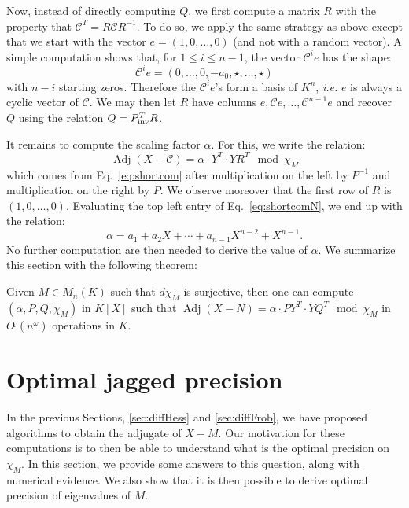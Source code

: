 \documentclass{sig-alternate-05-2015}
\DeclareMathOperator{\adj}{Adj}
\newcommand{\softO}{O\tilde{~}}
\newcommand{\inv}{\text{\rm inv}}
\begin{document}
Now, instead of directly computing $Q$, we first compute a matrix $R$ 
with the property that $\mathscr{C}^T = R \mathscr{C} R^{-1}$. To do so,
we apply the same strategy as above except that we start with the vector
$e = (1, 0, \ldots, 0)$ (and not with a random vector). A simple computation shows
that, for $1 \leq i \leq n{-}1$, the vector $\mathscr{C}^i e$ has the shape:
$$\mathscr{C}^i e = (0, \ldots, 0, -a_0, \star, \ldots, \star)$$
with $n{-}i$ starting zeros. Therefore the $\mathscr{C}^i e$'s form a basis of
$K^n$, \emph{i.e.} $e$ is always a cyclic vector of $\mathscr{C}$.
We may then let $R$ have columns $e, \mathscr{C}e, \dots, \mathscr{C}^{n-1}e$
and recover $Q$ using the relation $Q = P_\inv^T R$.

It remains to compute the scaling factor $\alpha$. For this, we write
the relation:
\begin{equation}
\label{eq:shortcomN}
\adj(X{-}\mathscr{C}) = \alpha \cdot Y^T \cdot Y R^T \mod \chi_M
\end{equation}
which comes from Eq.~\eqref{eq:shortcom} after multiplication on the 
left by $P^{-1}$ and multiplication on the right by $P$. We observe
moreover that the first row of $R$ is $(1, 0, \ldots, 0)$. Evaluating
the top left entry of Eq.~\eqref{eq:shortcomN}, we end up with the 
relation:
$$\alpha = a_1 + a_2 X + \cdots + a_{n-1} X^{n-2} + X^{n-1}.$$
No further computation are then needed to derive the value of $\alpha$.
We summarize this section with the following theorem:

\begin{theo}
\label{thm:compute_shortcom}
Given $M \in M_n(K)$ such that $d \chi_M$ is surjective,
then one can compute $(\alpha, P, Q, \chi_M)$
in $K[X]$ such that
$\adj(X{-}N) = \alpha \cdot P Y^T \cdot Y Q^T \mod \chi_M$
in $\softO(n^\omega)$ operations in $K.$
\end{theo}

\section{Optimal jagged precision}
\label{sec:optjagged}

In the previous Sections, \ref{sec:diffHess} and \ref{sec:diffFrob},
we have proposed algorithms to obtain the adjugate of 
$X-M.$ Our motivation for these computations is to then
be able to understand what is the optimal precision on $\chi_M.$
In this section, we provide some answers to this question,
along with numerical evidence.
We also show that it is then possible to derive 
optimal precision of eigenvalues of $M.$ 
\end{document}
